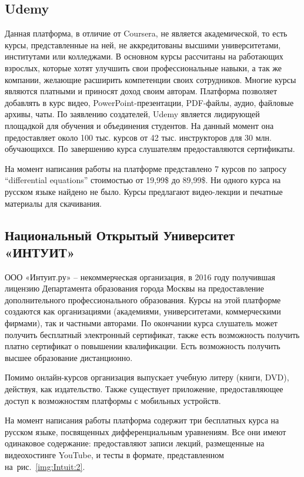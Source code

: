 \documentclass[14pt,russian]{extarticle}
\begin{document}
\subsection{Udemy}

Данная платформа, в отличие от Coursera, не является академической, то есть курсы, представленные на ней, не аккредитованы высшими университетами, институтами или колледжами. В основном курсы рассчитаны на работающих взрослых, которые хотят улучшить свои профессиональные навыки, а так же компании, желающие расширить компетенции своих сотрудников. Многие курсы являются платными и приносят доход своим авторам. Платформа позволяет добавлять в курс видео, PowerPoint-презентации, PDF-файлы, аудио, файловые архивы, чаты. По заявлению создателей, Udemy является лидирующей площадкой для обучения и объединения студентов. На данный момент она предоставляет около 100 тыс. курсов от 42 тыс. инструкторов для 30 млн. обучающихся. По завершению курса слушателям предоставляются сертификаты.~\cite{cite:Udemy_about}

На момент написания работы на платформе представлено 7 курсов по запросу \enquote{differential equations} стоимостью от 19,99\$ до 89,99\$. Ни одного курса на русском языке найдено не было. Курсы предлагают видео-лекции и печатные материалы для скачивания.

\subsection{Национальный Открытый Университет «ИНТУИТ»}
ООО «Интуит.ру» -- некоммерческая организация, в 2016 году получившая лицензию Департамента образования города Москвы на предоставление дополнительного профессионального образования. Курсы на этой платформе создаются как организациями (академиями, университетами, коммерческими фирмами), так и частными авторами. По окончании курса слушатель может получить бесплатный электронный сертификат, также есть возможность получить платно сертификат о повышении квалификации. Есть возможность получить высшее образование дистанционно.~\cite{cite:Intuit_about}

 Помимо онлайн-курсов организация выпускает учебную литеру (книги, DVD), действуя, как издательство. Также существует приложение, предоставляющее доступ к возможностям платформы с мобильных устройств.

На момент написания работы платформа содержит три бесплатных курса на русском языке, посвященных дифференциальным уравнениям. Все они имеют одинаковое содержание: предоставляют записи лекций, размещенные на видеохостинге YouTube,
и тесты в формате, представленном на~рис.~\ref{img:Intuit:2}.
\end{document}

